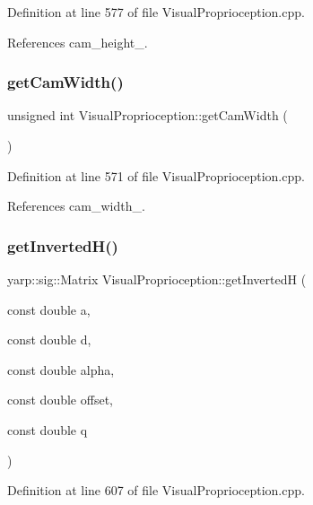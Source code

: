Definition at line 577 of file Visual\+Proprioception.\+cpp.



References cam\+\_\+height\+\_\+.

\mbox{\label{classVisualProprioception_ac0507d6a1074bce7d5b6219a296977a5}} 
\subsubsection{\texorpdfstring{get\+Cam\+Width()}{getCamWidth()}}
{\footnotesize\ttfamily unsigned int Visual\+Proprioception\+::get\+Cam\+Width (\begin{DoxyParamCaption}{ }\end{DoxyParamCaption})}



Definition at line 571 of file Visual\+Proprioception.\+cpp.



References cam\+\_\+width\+\_\+.

\mbox{\label{classVisualProprioception_a30b0283a5c8b29bdf828c291e7868e51}} 
\subsubsection{\texorpdfstring{get\+Inverted\+H()}{getInvertedH()}}
{\footnotesize\ttfamily yarp\+::sig\+::\+Matrix Visual\+Proprioception\+::get\+InvertedH (\begin{DoxyParamCaption}\item[{const double}]{a,  }\item[{const double}]{d,  }\item[{const double}]{alpha,  }\item[{const double}]{offset,  }\item[{const double}]{q }\end{DoxyParamCaption})\hspace{0.3cm}{\ttfamily [protected]}}



Definition at line 607 of file Visual\+Proprioception.\+cpp.



